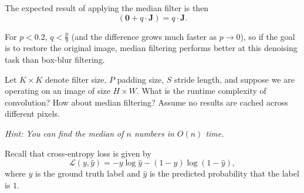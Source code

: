 \documentclass[11pt]{article}
\begin{document}
\begin{subparts}
{        The expected result of applying the median filter is then
        $$ \left( \mathbf{0} + q \cdot \mathbf{J} \right) = q \cdot \mathbf{J}.$$
        
        For $p < 0.2$, $q < \frac{p}{9}$ (and the difference grows much faster as $p \rightarrow 0$), so if the goal is to restore the original image, median filtering performs better at this denoising task than box-blur filtering.
    }
    \subpart Let $K \times K$ denote filter size, $P$ padding size, $S$ stride length, and suppose we are operating on an image of size $H \times W$. What is the runtime complexity of convolution? How about median filtering? Assume no results are cached across different pixels.

    \emph{Hint: You can find the median of $n$ numbers in $O(n)$ time.}


\end{subparts}

\newpage

	Recall that cross-entropy loss is given by
    $$
    \mathcal{L}(y, \hat{y}) = - y \log \hat{y} - (1 - y) \log (1 - \hat{y}),
    $$
    where $y$ is the ground truth label and $\hat{y}$ is the predicted probability that the label is $1$.
\end{document}
